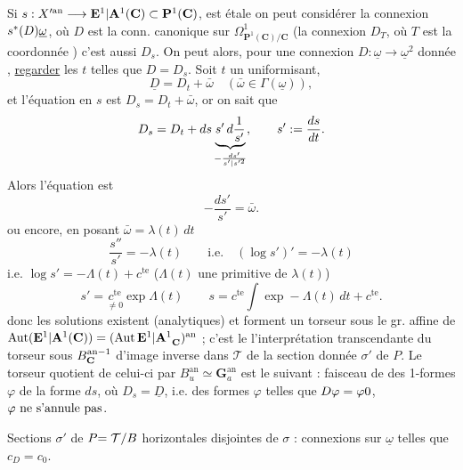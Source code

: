  Si $s:X'^{\mathrm{an}}\longrightarrow{\mathbf E^1|\mathbf A^1}(\mathbf C)\subset\mathbf P^1(\mathbf C)$, est étale on peut considérer la connexion  $s^*(D){{\underline\omega}}$, où $D$ est la conn. canonique sur $\Omega^1_{\mathbf P^1(\mathbf C)/\mathbf C}$ \deleted{\unsure{\varphi}} (la connexion $D_T$, où $T$ est la coordonnée ) c'est aussi $D_s$. On peut alors,  pour une connexion  $D:\underline\omega\longrightarrow\underline\omega^2$ donnée , \uline{regarder} les $t$ telles que $D=D_s$.  Soit $t$ un uniformisant, 
\[
\underline D=D_t+\bar\omega\quad(\bar\omega\in\Gamma(\underline\omega)),
\]
et l'équation en $s$ est $D_s=D_t+\bar\omega$, or on sait que
\[
D_s=D_t+{{ds}}\underbrace{s'\,d\frac1{s'}}_{-\frac{ds'}{{s'|s'^2}}},\qquad s':=\frac{ds}{dt}.
\]
Alors l'équation est
\[
-\frac{ds'}{s'}=\bar\omega.
\]
ou encore, en posant $\bar\omega=\lambda(t)\,dt$
\[
\frac{s''}{s'}=-\lambda(t)\qquad\text{i.e.}\quad(\log s')'=-\lambda(t)
\]
i.e. $\log s'=-\Lambda(t)+c^{\mathrm{te}}$ ($\Lambda(t)$ une primitive de $\lambda(t)$)
\[
s'=\underset{\ne0}{c^{\mathrm{te}}}\exp\Lambda(t)\qquad
s=c^{\mathrm{te}}\int\exp-\Lambda(t)\,dt+c^{\mathrm{te}}.
\]
donc les solutions existent (analytiques) et  forment un torseur  sous le gr. affine de $\operatorname{Aut}({\mathbf E^1|\mathbf A^1}(\mathbf C))=(\operatorname{Aut}{\mathbf E^1|\mathbf A^1}_{\mathbf C})^{\mathrm{an}}$ ; c'est le  l'interprétation transcendante du torseur \deleted{\unsure{\longrightarrow}} sous $B_{\mathbf C}^{\mathrm{an}{{-1}}}$  d'image inverse dans $\mathcal T$ de la section donnée $\sigma'$ de $P$. Le torseur quotient de celui-ci par $B_u^{\mathrm{an}}\simeq\mathbf G_a^{\mathrm{an}}$ est le suivant :
 faisceau de  des 1-formes $\varphi$ de la forme $ds$, où $D_s=\underline D$, i.e. des formes $\varphi$ telles que ${D\varphi={{\varphi}}0}$, ${\varphi\text{ ne s'annule pas}}$.

 Sections $\sigma'$  de $P{=\mathcal T/B}$ horizontales disjointes de $\sigma$ : connexions sur $\underline\omega$ telles que $c_D=c_0$.

